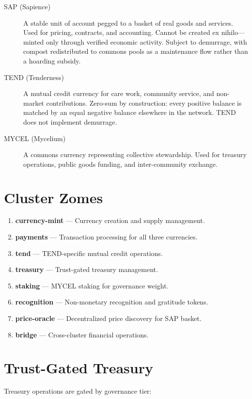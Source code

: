 \documentclass[12pt]{book}
\begin{document}
\begin{description}
  \item[SAP (Sapience)] A stable unit of account pegged to a basket of real
    goods and services. Used for pricing, contracts, and accounting. Cannot be
    created ex nihilo---minted only through verified economic activity. Subject
    to demurrage, with compost redistributed to commons pools as a maintenance
    flow rather than a hoarding subsidy.
  \item[TEND (Tenderness)] A mutual credit currency for care work, community
    service, and non-market contributions. Zero-sum by construction: every
    positive balance is matched by an equal negative balance elsewhere in the
    network. TEND does not implement demurrage.
  \item[MYCEL (Mycelium)] A commons currency representing collective
    stewardship. Used for treasury operations, public goods funding, and
    inter-community exchange.
\end{description}

\section{Cluster Zomes}

\begin{enumerate}
  \item \textbf{currency-mint} --- Currency creation and supply management.
  \item \textbf{payments} --- Transaction processing for all three currencies.
  \item \textbf{tend} --- TEND-specific mutual credit operations.
  \item \textbf{treasury} --- Trust-gated treasury management.
  \item \textbf{staking} --- MYCEL staking for governance weight.
  \item \textbf{recognition} --- Non-monetary recognition and gratitude tokens.
  \item \textbf{price-oracle} --- Decentralized price discovery for SAP basket.
  \item \textbf{bridge} --- Cross-cluster financial operations.
\end{enumerate}

\section{Trust-Gated Treasury}

Treasury operations are gated by governance tier:
\end{document}
